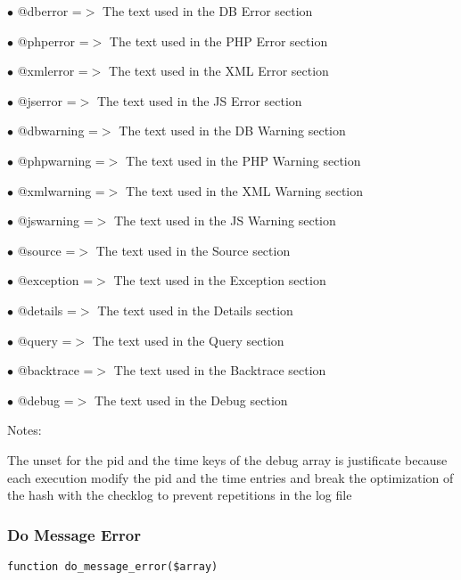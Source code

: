 \documentclass[a4paper]{article}
\begin{document}
\begin{compactitem}
\item[\color{myblue}$\bullet$] @dberror    =$>$ The text used in the DB Error section
\item[\color{myblue}$\bullet$] @phperror   =$>$ The text used in the PHP Error section
\item[\color{myblue}$\bullet$] @xmlerror   =$>$ The text used in the XML Error section
\item[\color{myblue}$\bullet$] @jserror    =$>$ The text used in the JS Error section
\item[\color{myblue}$\bullet$] @dbwarning  =$>$ The text used in the DB Warning section
\item[\color{myblue}$\bullet$] @phpwarning =$>$ The text used in the PHP Warning section
\item[\color{myblue}$\bullet$] @xmlwarning =$>$ The text used in the XML Warning section
\item[\color{myblue}$\bullet$] @jswarning  =$>$ The text used in the JS Warning section
\item[\color{myblue}$\bullet$] @source     =$>$ The text used in the Source section
\item[\color{myblue}$\bullet$] @exception  =$>$ The text used in the Exception section
\item[\color{myblue}$\bullet$] @details    =$>$ The text used in the Details section
\item[\color{myblue}$\bullet$] @query      =$>$ The text used in the Query section
\item[\color{myblue}$\bullet$] @backtrace  =$>$ The text used in the Backtrace section
\item[\color{myblue}$\bullet$] @debug      =$>$ The text used in the Debug section
\end{compactitem}

Notes:

The unset for the pid and the time keys of the debug array is justificate
because each execution modify the pid and the time entries and break the
optimization of the hash with the checklog to prevent repetitions in the
log file

\hypertarget{toc113}{}
\subsubsection{Do Message Error}

\begin{lstlisting}
function do_message_error($array)
\end{lstlisting}
\end{document}
